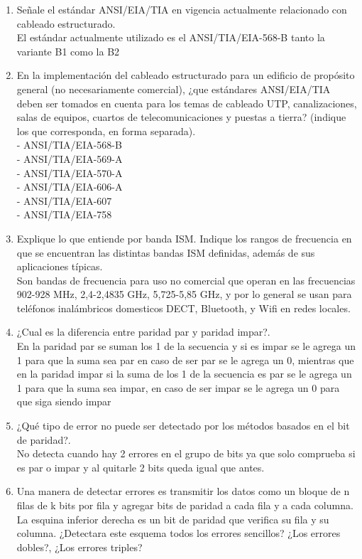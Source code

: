 \documentclass{udparticle}
\begin{document}
\begin{enumerate}
\item Señale el estándar ANSI/EIA/TIA en vigencia actualmente relacionado con cableado estructurado.\\
El estándar actualmente utilizado es el ANSI/TIA/EIA-568-B tanto la variante B1 como la B2\\
\item En la implementación del cableado estructurado para un edificio de propósito general (no necesariamente comercial), ¿que estándares ANSI/EIA/TIA deben ser tomados en cuenta para los temas de cableado UTP, canalizaciones, salas de equipos, cuartos de telecomunicaciones y puestas a tierra? (indique los que corresponda, en forma separada).\\
- ANSI/TIA/EIA-568-B\\
- ANSI/TIA/EIA-569-A\\
- ANSI/TIA/EIA-570-A\\
- ANSI/TIA/EIA-606-A\\
- ANSI/TIA/EIA-607\\
- ANSI/TIA/EIA-758\\
\item Explique lo que entiende por banda ISM. Indique los rangos de frecuencia en que se encuentran las distintas bandas ISM definidas, además de sus aplicaciones típicas.\\
Son bandas de frecuencia para uso no comercial que operan en las frecuencias 902-928 MHz, 2,4-2,4835 GHz, 5,725-5,85 GHz, y por lo general se usan para teléfonos inalámbricos domesticos DECT, Bluetooth, y Wifi en redes locales.\\
\item  ¿Cual es la diferencia entre paridad par y paridad impar?.\\
En la paridad par se suman los 1 de la secuencia y si es impar se le agrega un 1 para que la suma sea par en caso de ser par se le agrega un 0, mientras que en la paridad impar si la suma de los 1 de la secuencia es par se le agrega un 1 para que la suma sea impar, en caso de ser impar se le agrega un 0 para que siga siendo impar\\
\item ¿Qué tipo de error no puede ser detectado por los métodos basados en el bit de paridad?.\\
No detecta cuando hay 2 errores en el grupo de bits ya que solo comprueba si es par o impar y al quitarle 2 bits queda igual que antes.\\
\item Una manera de detectar errores es transmitir los datos como un bloque de n filas de k bits por fila y agregar bits de paridad a cada fila y a cada columna. La esquina inferior derecha es un bit de paridad que verifica su fila y su columna. ¿Detectara este esquema todos los errores sencillos? ¿Los errores dobles?, ¿Los errores triples?\\

\end{enumerate}
\end{document}

